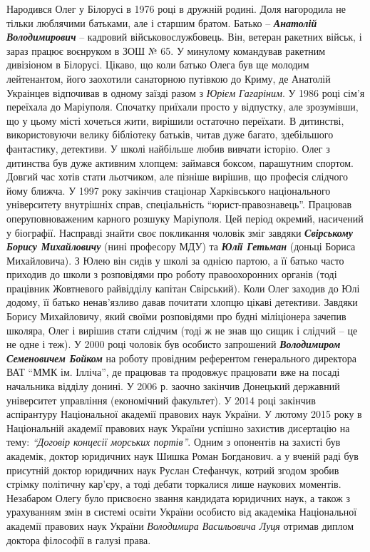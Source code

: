 Народився Олег у Білорусі в 1976 році в дружній родині. Доля нагородила не
тільки люблячими батьками, але і старшим братом. Батько – \emph{\textbf{Анатолій
Володимирович}} – кадровий військовослужбовець. Він, ветеран ракетних військ, і
зараз працює воєнруком в ЗОШ № 65. У минулому командував ракетним дивізіоном в
Білорусі. Цікаво, що коли батько Олега був ще молодим лейтенантом, його
заохотили санаторною путівкою до Криму, де Анатолій Украінцев відпочивав в
одному заїзді разом з \emph{Юрієм Гагаріним}. У 1986 році сім'я переїхала до
Маріуполя. Спочатку приїхали просто у відпустку, але зрозумівши, що у цьому
місті хочеться жити, вирішили остаточно переїхати. В дитинстві, використовуючи
велику бібліотеку батьків, читав дуже багато, здебільшого фантастику,
детективи. У школі найбільше любив вивчати історію. Олег з дитинства був дуже
активним хлопцем: займався боксом, парашутним спортом. Довгий час хотів стати
льотчиком, але пізніше вирішив, що професія слідчого йому ближча. У 1997 року
закінчив стаціонар Харківського національного університету внутрішніх справ,
спеціальність \enquote{юрист-правознавець}. Працював оперуповноваженим карного розшуку
Маріуполя. Цей період окремий, насичений у біографії. Насправді знайти своє
покликання чоловік зміг завдяки \emph{\textbf{Свірському Борису Михайловичу}} (нині професору
МДУ) та \emph{\textbf{Юлії Гетьман}} (доньці Бориса Михайловича). З Юлею він сидів у школі за
однією партою, а її батько часто приходив до школи з розповідями про роботу
правоохоронних органів (тоді працівник Жовтневого райвідділу капітан
Свірський). Коли Олег заходив до Юлі додому, її батько ненав'язливо давав
почитати хлопцю цікаві детективи. Завдяки Борису Михайловичу, який своїми
розповідями про будні міліціонера зачепив школяра, Олег і вирішив стати слідчим
(тоді ж не знав що сищик і слідчий – це не одне і теж). У 2000 році чоловік був
особисто запрошений \emph{\textbf{Володимиром Семеновичем Бойком}} на роботу провідним
референтом генерального директора ВАТ \enquote{ММК ім. Ілліча}, де працював та
продовжує працювати вже на посаді начальника відділу донині. У 2006 р. заочно
закінчив Донецький державний університет управління (економічний факультет). У
2014 році закінчив аспірантуру Національної академії правових наук України. У
лютому 2015 року в Національній академії правових наук України успішно захистив
дисертацію на тему: \emph{\enquote{Договір концесії морських портів}}. Одним з опонентів на
захисті був академік, доктор юридичних наук Шишка Роман Богданович. а у вченій
раді був присутній доктор юридичних наук Руслан Стефанчук, котрий згодом зробив
стрімку політичну кар'єру, а тоді дебати торкалися лише наукових моментів.
Незабаром Олегу було присвоєно звання кандидата юридичних наук, а також з
урахуванням змін в системі освіти України особисто від академіка Національної
академії правових наук України \emph{Володимира Васильовича Луця} отримав диплом
доктора філософії в галузі права.

